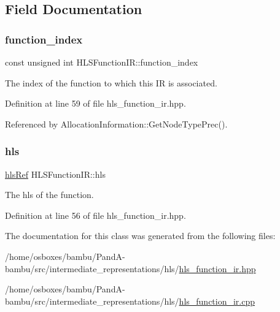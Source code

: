 \subsection{Field Documentation}
\mbox{\label{classHLSFunctionIR_ae35237f38b8d023319c7a47ad5cf6ea1}} 
\subsubsection{\texorpdfstring{function\+\_\+index}{function\_index}}
{\footnotesize\ttfamily const unsigned int H\+L\+S\+Function\+I\+R\+::function\+\_\+index\hspace{0.3cm}{\ttfamily [protected]}}



The index of the function to which this IR is associated. 



Definition at line 59 of file hls\+\_\+function\+\_\+ir.\+hpp.



Referenced by Allocation\+Information\+::\+Get\+Node\+Type\+Prec().

\mbox{\label{classHLSFunctionIR_a17e8a19b4e2c92ca308238fb5b29ceaa}} 
\subsubsection{\texorpdfstring{hls}{hls}}
{\footnotesize\ttfamily \hyperlink{hls_8hpp_a75d0c73923d0ddfa28c4843a802c73a7}{hls\+Ref} H\+L\+S\+Function\+I\+R\+::hls\hspace{0.3cm}{\ttfamily [protected]}}



The hls of the function. 



Definition at line 56 of file hls\+\_\+function\+\_\+ir.\+hpp.



The documentation for this class was generated from the following files\+:\begin{DoxyCompactItemize}
\item 
/home/osboxes/bambu/\+Pand\+A-\/bambu/src/intermediate\+\_\+representations/hls/\hyperlink{hls__function__ir_8hpp}{hls\+\_\+function\+\_\+ir.\+hpp}\item 
/home/osboxes/bambu/\+Pand\+A-\/bambu/src/intermediate\+\_\+representations/hls/\hyperlink{hls__function__ir_8cpp}{hls\+\_\+function\+\_\+ir.\+cpp}\end{DoxyCompactItemize}
